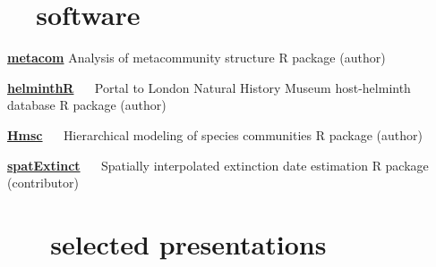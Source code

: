 \documentclass[]{CV}
\begin{document}
\section{\faCode \ \  software}
\begin{entrylist}
 \entry
 {\href{http://cran.r-project.org/web/packages/metacom/}{\textbf{metacom}}}
 {Analysis of metacommunity structure} 
 {R package (author)}

 \entry
 {\href{http://github.com/ropensci/helminthR}{\textbf{helminthR}} \ \ }
 {Portal to London Natural History Museum host-helminth database}
 {R package (author)}

 \entry
 {\href{https://github.com/hmsc-r/HMSC}{\textbf{Hmsc}} \ \ }
 {Hierarchical modeling of species communities}
 {R package (author)}

 \entry
 {\href{http://github.com/cjcarlson/spatExtinct}{\textbf{spatExtinct}} \ \ }
 {Spatially interpolated extinction date estimation}
 {R package (contributor)}

\end{entrylist}





\section{\faVideoCamera \ \ \ selected presentations}
\end{document}
